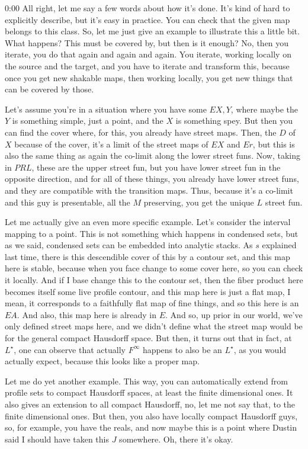 \begin{unfinished}{0:00}
All right, let me say a few words about how it's done. It's kind of hard to explicitly describe, but it's easy in practice. You can check that the given map belongs to this class. So, let me just give an example to illustrate this a little bit. What happens? This must be covered by, but then is it enough? No, then you iterate, you do that again and again and again. You iterate, working locally on the source and the target, and you have to iterate and transform this, because once you get new shakable maps, then working locally, you get new things that can be covered by those.

Let's assume you're in a situation where you have some $EX, Y$, where maybe the $Y$ is something simple, just a point, and the $X$ is something spey. But then you can find the cover where, for this, you already have street maps. Then, the $D$ of $X$ because of the cover, it's a limit of the street maps of $EX$ and $Er$, but this is also the same thing as again the co-limit along the lower street funs. Now, taking in $PRL$, these are the upper street fun, but you have lower street fun in the opposite direction, and for all of these things, you already have lower street funs, and they are compatible with the transition maps. Thus, because it's a co-limit and this guy is presentable, all the $M$ preserving, you get the unique $L$ street fun.

Let me actually give an even more specific example. Let's consider the interval mapping to a point. This is not something which happens in condensed sets, but as we said, condensed sets can be embedded into analytic stacks. As $s$ explained last time, there is this descendible cover of this by a contour set, and this map here is stable, because when you face change to some cover here, so you can check it locally. And if I base change this to the contour set, then the fiber product here becomes itself some live profile contour, and this map here is just a flat map, I mean, it corresponds to a faithfully flat map of fine things, and so this here is an $EA$. And also, this map here is already in $E$. And so, up prior in our world, we've only defined street maps here, and we didn't define what the street map would be for the general compact Hausdorff space. But then, it turns out that in fact, at $L^{\star}$, one can observe that actually $F^{\infty}$ happens to also be an $L^{\star}$, as you would actually expect, because this looks like a proper map.

Let me do yet another example. This way, you can automatically extend from profile sets to compact Hausdorff spaces, at least the finite dimensional ones. It also gives an extension to all compact Hausdorff, no, let me not say that, to the finite dimensional ones. But then, you also have locally compact Hausdorff guys, so, for example, you have the reals, and now maybe this is a point where Dustin said I should have taken this $J$ somewhere. Oh, there it's okay.


\end{unfinished}
